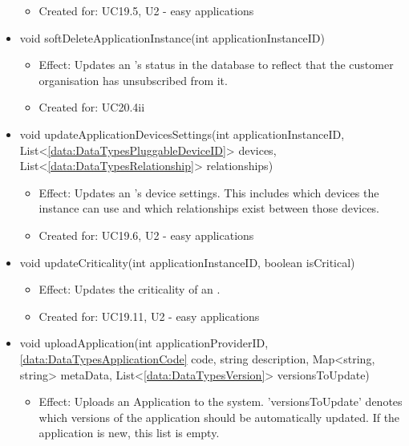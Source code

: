 \begin{description}
\begin{itemize}[noitemsep,nolistsep,leftmargin=-.25cm]
\begin{itemize}[noitemsep,nolistsep]
\item Created for: UC19.5, U2 - easy applications
        \end{itemize}
      \item \textsf{void softDeleteApplicationInstance(int applicationInstanceID)}
        \begin{itemize}[noitemsep,nolistsep]
           \item Effect: Updates an 's status in the database to reflect that the customer organisation has unsubscribed from it.
\item Created for: UC20.4ii
        \end{itemize}
      \item \textsf{void updateApplicationDevicesSettings(int applicationInstanceID, List\textless{}\ref{data:DataTypesPluggableDeviceID}\textgreater{} devices, List\textless{}\ref{data:DataTypesRelationship}\textgreater{} relationships)}
        \begin{itemize}[noitemsep,nolistsep]
           \item Effect: Updates an 's device settings. This includes which devices the instance can use and which relationships exist between those devices.
\item Created for: UC19.6, U2 - easy applications
        \end{itemize}
      \item \textsf{void updateCriticality(int applicationInstanceID, boolean isCritical)}
        \begin{itemize}[noitemsep,nolistsep]
           \item Effect: Updates the criticality of an .
\item Created for: UC19.11, U2 - easy applications
        \end{itemize}
      \item \textsf{void uploadApplication(int applicationProviderID, \ref{data:DataTypesApplicationCode} code, string description, Map\textless{}string, string\textgreater{} metaData, List\textless{}\ref{data:DataTypesVersion}\textgreater{} versionsToUpdate)}
        \begin{itemize}[noitemsep,nolistsep]
           \item Effect: Uploads an Application to the system. 'versionsToUpdate' denotes which versions of the application should be automatically updated. If the application is new, this list is empty. \\

\end{itemize}
\end{itemize}
\end{description}
